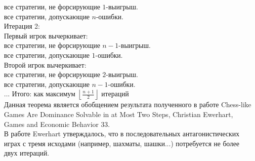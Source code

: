 \documentclass[pdftex,12pt,a4paper]{article}
\begin{document}
все стратегии, не форсирующие $1$-выигрыш.\\
все стратегии, допускающие $n$-ошибки. \\
Итерация 2: \\
Первый игрок вычеркивает: \\
все стратегии, не форсирующие $n-1$-выигрыш. \\
все стратегии, допускающие $1$-ошибки. \\
Второй игрок вычеркивает: \\
все стратегии, не форсирующие $2$-выигрыш. \\
все стратегии, допускающие $n-1$-ошибки. \\
...
Итого: как максимум $\left\lfloor\frac{n+1}{2}\right\rfloor$ итераций \\

Данная теорема является обобщением результата полученного в работе Chess-like Games Are Dominance Solvable in at Most Two Steps, Christian Ewerhart, Games and Economic Behavior 33. \\
В работе Ewerhart утверждалось, что в последовательных антагонистических играх с тремя исходами (например, шахматы, шашки...) потребуется не более двух итераций. \\













\end{document}
